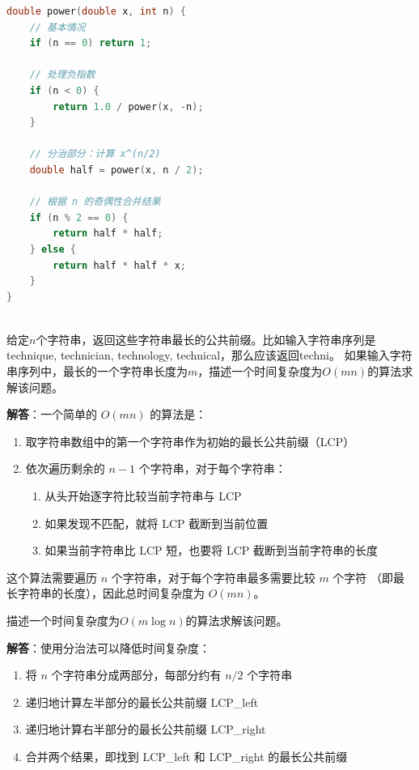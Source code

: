 \documentclass[12pt,twoside]{article}
\begin{document}
\begin{problems}
\begin{lstlisting}[language=C++]
double power(double x, int n) {
    // 基本情况
    if (n == 0) return 1;
    
    // 处理负指数
    if (n < 0) {
        return 1.0 / power(x, -n);
    }
    
    // 分治部分：计算 x^(n/2)
    double half = power(x, n / 2);
    
    // 根据 n 的奇偶性合并结果
    if (n % 2 == 0) {
        return half * half;
    } else {
        return half * half * x;
    }
}
\end{lstlisting}

\eparts

\newpage
{}  \\
给定$n$个字符串，返回这些字符串最长的公共前缀。比如输入字符串序列是 technique, 
technician, technology, technical，那么应该返回techni。
\bparts
\ppart 如果输入字符串序列中，最长的一个字符串长度为$m$，描述一个时间复杂度为$O(mn)$的算法求解该问题。

\textbf{解答}：一个简单的 $O(mn)$ 的算法是：

\begin{enumerate}
\item 取字符串数组中的第一个字符串作为初始的最长公共前缀（LCP）
\item 依次遍历剩余的 $n-1$ 个字符串，对于每个字符串：
   \begin{enumerate}
   \item 从头开始逐字符比较当前字符串与 LCP
   \item 如果发现不匹配，就将 LCP 截断到当前位置
   \item 如果当前字符串比 LCP 短，也要将 LCP 截断到当前字符串的长度
   \end{enumerate}
\end{enumerate}

这个算法需要遍历 $n$ 个字符串，对于每个字符串最多需要比较 $m$ 个字符
（即最长字符串的长度），因此总时间复杂度为 $O(mn)$。

\ppart 描述一个时间复杂度为$O(m\log n)$的算法求解该问题。

\textbf{解答}：使用分治法可以降低时间复杂度：

\begin{enumerate}
\item 将 $n$ 个字符串分成两部分，每部分约有 $n/2$ 个字符串
\item 递归地计算左半部分的最长公共前缀 LCP\_left
\item 递归地计算右半部分的最长公共前缀 LCP\_right
\item 合并两个结果，即找到 LCP\_left 和 LCP\_right 的最长公共前缀
\end{enumerate}


\end{problems}
\end{document}
